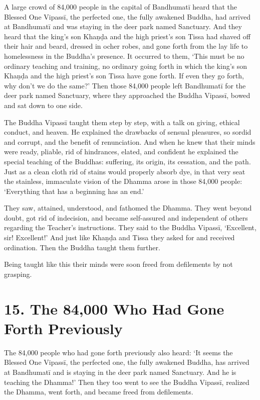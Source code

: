 \documentclass[12pt,openany]{book}%
\begin{document}
A large crowd of 84,000 people in the capital of \textsanskrit{Bandhumatī} heard that the Blessed One \textsanskrit{Vipassī}, the perfected one, the fully awakened Buddha, had arrived at \textsanskrit{Bandhumatī} and was staying in the deer park named Sanctuary. And they heard that the king’s son \textsanskrit{Khaṇḍa} and the high priest’s son Tissa had shaved off their hair and beard, dressed in ocher robes, and gone forth from the lay life to homelessness in the Buddha’s presence. It occurred to them, ‘This must be no ordinary teaching and training, no ordinary going forth in which the king’s son \textsanskrit{Khaṇḍa} and the high priest’s son Tissa have gone forth. If even they go forth, why don’t we do the same?’ Then those 84,000 people left \textsanskrit{Bandhumatī} for the deer park named Sanctuary, where they approached the Buddha \textsanskrit{Vipassī}, bowed and sat down to one side. 

The Buddha \textsanskrit{Vipassī} taught them step by step, with a talk on giving, ethical conduct, and heaven. He explained the drawbacks of sensual pleasures, so sordid and corrupt, and the benefit of renunciation. And when he knew that their minds were ready, pliable, rid of hindrances, elated, and confident he explained the special teaching of the Buddhas: suffering, its origin, its cessation, and the path. Just as a clean cloth rid of stains would properly absorb dye, in that very seat the stainless, immaculate vision of the Dhamma arose in those 84,000 people: ‘Everything that has a beginning has an end.’ 

They saw, attained, understood, and fathomed the Dhamma. They went beyond doubt, got rid of indecision, and became self-assured and independent of others regarding the Teacher’s instructions. They said to the Buddha \textsanskrit{Vipassī}, ‘Excellent, sir! Excellent!’ And just like \textsanskrit{Khaṇḍa} and Tissa they asked for and received ordination. Then the Buddha taught them further. 

Being taught like this their minds were soon freed from defilements by not grasping. 

\section*{15. The 84,000 Who Had Gone Forth Previously }

The 84,000 people who had gone forth previously also heard: ‘It seems the Blessed One \textsanskrit{Vipassī}, the perfected one, the fully awakened Buddha, has arrived at \textsanskrit{Bandhumatī} and is staying in the deer park named Sanctuary. And he is teaching the Dhamma!’ Then they too went to see the Buddha \textsanskrit{Vipassī}, realized the Dhamma, went forth, and became freed from defilements. 
\end{document}
